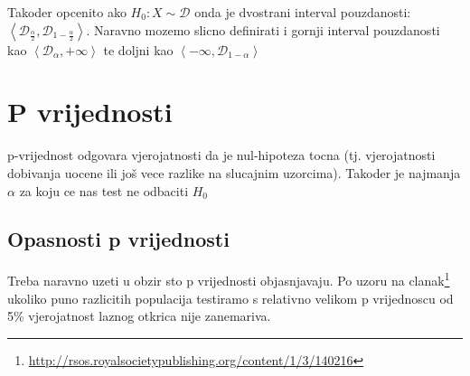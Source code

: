 Takoder opcenito ako $H_0: X \sim \mathcal{D}$ onda je dvostrani interval pouzdanosti: 
$\left< \mathcal{D}_{\frac{\alpha}{2}}, \mathcal{D}_{1-\frac{\alpha}{2}} \right>$. Naravno mozemo slicno definirati i gornji interval pouzdanosti kao  
$\left< \mathcal{D}_\alpha, +\infty \right>$ te doljni kao 
$\left< -\infty, \mathcal{D}_{1-\alpha} \right>$

\section{P vrijednosti}
p-vrijednost odgovara vjerojatnosti da je nul-hipoteza tocna (tj. vjerojatnosti dobivanja uocene ili još vece razlike na slucajnim uzorcima). Takoder je najmanja $\alpha$ za koju ce nas test ne odbaciti $H_0$

\subsection{Opasnosti p vrijednosti}
Treba naravno uzeti u obzir sto p vrijednosti objasnjavaju. Po uzoru na clanak\footnote{\url{http://rsos.royalsocietypublishing.org/content/1/3/140216}} ukoliko puno razlicitih populacija testiramo s relativno velikom p vrijednoscu od 5\% vjerojatnost laznog otkrica nije zanemariva. 